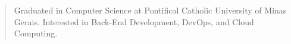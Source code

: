 \begin{quote}
    Graduated in Computer Science at Pontifical Catholic University of Minas Gerais. Interested in Back-End Development, DevOps, and Cloud Computing.
\end{quote}